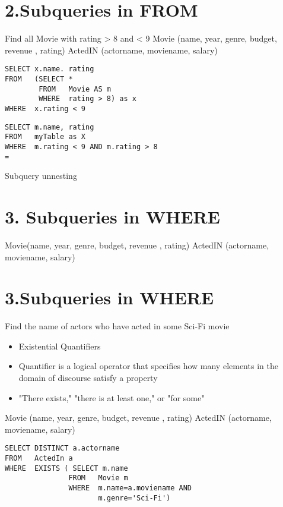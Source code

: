 \documentclass{article}
\begin{document}
\section*{2.Subqueries in FROM}

Find all Movie with rating > 8 and < 9 Movie (name, year, genre, budget, revenue , rating) ActedIN (actorname, moviename, salary)

\begin{verbatim}
SELECT x.name. rating
FROM   (SELECT *
        FROM   Movie AS m
        WHERE  rating > 8) as x
WHERE  x.rating < 9
\end{verbatim}

\begin{verbatim}
SELECT m.name, rating
FROM   myTable as X
WHERE  m.rating < 9 AND m.rating > 8
=
\end{verbatim}

Subquery unnesting

\section*{3. Subqueries in WHERE}

Movie(name, year, genre, budget, revenue , rating) ActedIN (actorname, moviename, salary)

\section*{3.Subqueries in WHERE}

Find the name of actors who have acted in some Sci-Fi movie

\begin{itemize}
\item Existential Quantifiers
\item Quantifier is a logical operator that specifies how many elements in the domain of discourse satisfy a property
\item "There exists," "there is at least one," or "for some"
\end{itemize}

Movie (name, year, genre, budget, revenue , rating) ActedIN (actorname, moviename, salary)

\begin{verbatim}
SELECT DISTINCT a.actorname
FROM   ActedIn a
WHERE  EXISTS ( SELECT m.name
               FROM   Movie m
               WHERE  m.name=a.moviename AND
                      m.genre='Sci-Fi')
\end{verbatim}
\end{document}
